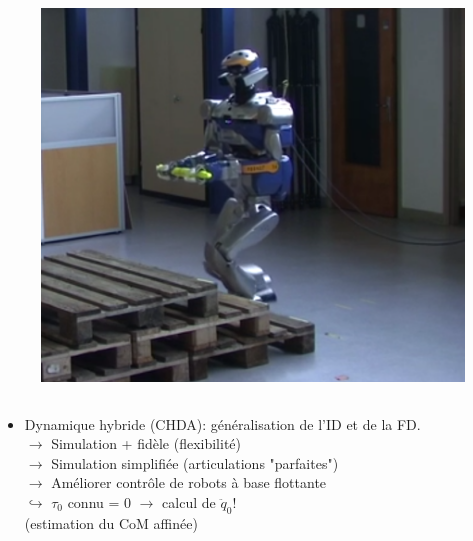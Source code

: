 \documentclass[10pt]{beamer}
\begin{document}
\begin{frame}[allowframebreaks]
\begin{figure}[T]
\begin{columns}[T]
\begin{column}{.3\textwidth}
\begin{center}
		  \bigskip
			\href{run:/home/nuno/Documents/Stage/Documents/Videos/14-ichr-metapod-v6-submitted.mp4}{\includegraphics[width=.9\textwidth]{figs/hrp2Control}}
			\hfill
			\end{center}
		\end{column}
	\end{columns}
	\end{figure}
	  
	\framebreak
	
	\begin{block}{}
	\begin{spacing}{1.2}
	\begin{itemize}
	\item Dynamique hybride (CHDA): généralisation de l'ID et de la FD.\\
	      $\rightarrow$ Simulation + fidèle (flexibilité) \\
        $\rightarrow$ Simulation simplifiée (articulations "parfaites") \\
        $\rightarrow$ Améliorer contrôle de robots à base flottante \\
                      $\hookrightarrow$ $\tau_0$ connu = 0 $\rightarrow$ calcul de $\ddot{q}_0$! \\
                                        (estimation du CoM affinée)
  \end{itemize}
  \end{spacing}
  \end{block}
	

\end{frame}
\end{document}
